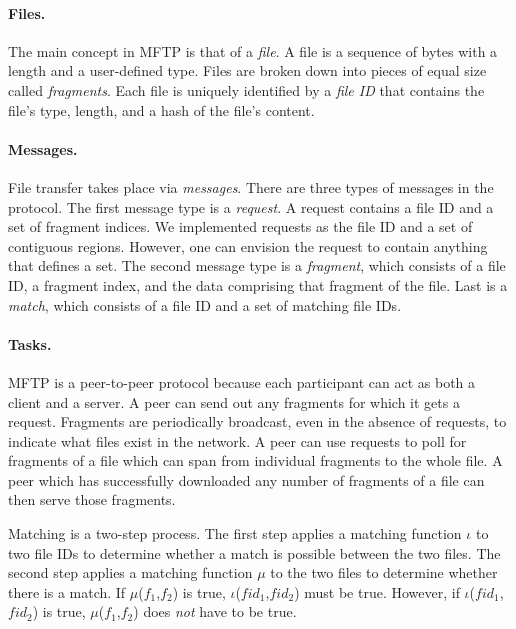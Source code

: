 \documentclass[letterpaper]{article}
\begin{document}
\paragraph {Files.}
The main concept in MFTP is that of a \emph{file}.
A file is a sequence of bytes with a length and a user-defined type.
Files are broken down into pieces of equal size called \emph{fragments}.
Each file is uniquely identified by a \emph{file ID} that contains the file's type, length, and a hash of the file's content.

\paragraph{Messages.}
File transfer takes place via \emph{messages}.
There are three types of messages in the protocol.
The first message type is a \emph{request}.
A request contains a file ID and a set of fragment indices.
We implemented requests as the file ID and a set of contiguous regions.  
However, one can envision the request to contain anything that defines a set.
The second message type is a \emph{fragment}, which consists of a file ID, a fragment index, and the data comprising that fragment of the file.
Last is a \emph{match}, which consists of a file ID and a set of matching file IDs.

\paragraph {Tasks.}
MFTP is a peer-to-peer protocol because each participant can act as both a client and a server.
A peer can send out any fragments for which it gets a request.
Fragments are periodically broadcast, even in the absence of requests, to indicate what files exist in the network.
A peer can use requests to poll for fragments of a file which can span from individual fragments to the whole file.
A peer which has successfully downloaded any number of fragments of a file can then serve those fragments.

Matching is a two-step process.
The first step applies a matching function $\iota$ to two file IDs to determine whether a match is possible between the two files.  
The second step applies a matching function $\mu$ to the two files to determine whether there is a match.
If $\mu$($f_1$,$f_2$) is true, $\iota$($fid_1$,$fid_2$) must be true.
However, if $\iota$($fid_1$,$fid_2$) is true, $\mu$($f_1$,$f_2$) does \emph{not} have to be true. 
\end{document}
